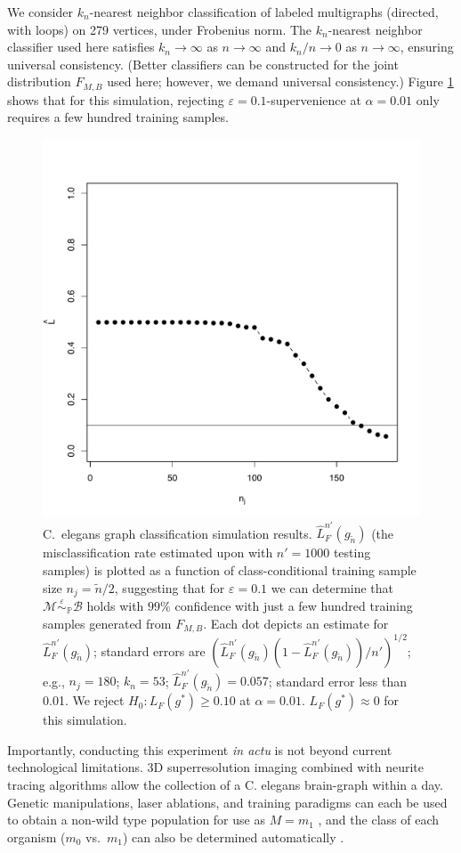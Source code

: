 \documentclass{article}
\newcommand{\mB}{\mathcal{B}}
\newcommand{\mM}{\mathcal{M}}
\newcommand{\PP}{\mathbb{P}}           %
\newcommand{\eps}{\varepsilon}
\providecommand{\mt}[1]{\widetilde{#1}}
\newcommand{\hL}{\widehat{L}}
\newcommand{\MeB}{\mM \overset{\varepsilon}{{\sim}}_{\PP} \mB}
\begin{document}
We consider $k_n$-nearest neighbor classification of labeled multigraphs (directed, with loops) on 279 vertices, under Frobenius norm. The $k_n$-nearest neighbor classifier used here satisfies $k_n \rightarrow \infty$ as $n \rightarrow \infty$ and $k_n/n \rightarrow 0$ as $n \rightarrow \infty$, ensuring universal consistency. (Better classifiers can be constructed for the joint distribution $F_{M,B}$ used here; however, we demand universal consistency.)  Figure \ref{fig1} shows that for this simulation, rejecting $\eps=0.1$-supervenience at $\alpha=0.01$ only requires a few hundred training samples.

\begin{figure}[!ht]
\centering 
\includegraphics[width=.5\linewidth]{Lhatplot}
\caption{C.~elegans graph classification simulation results.  $\hL^{n'}_{F}(g_{\mt{n}})$  (the misclassification rate estimated upon with $n'=1000$ testing samples) %
is plotted as a function of class-conditional training sample size $n_j=\mt{n}/2$, suggesting that for $\varepsilon=0.1$ we can determine that $\MeB$ holds with $99\%$ confidence with just a few hundred training samples generated from $F_{M,B}$. Each dot depicts an estimate for $\hL^{n'}_{F}(g_{\mt{n}})$; standard errors are $(\hL^{n'}_{F}(g_{\mt{n}}) (1-\hL^{n'}_{F}(g_{\mt{n}}))/n')^{1/2}$; e.g., $n_j = 180$; $k_n = 53$; $\hL^{n'}_{F}(g_{\mt{n}}) = 0.057$; standard error less than 0.01. We reject $H_0: L_{F}(g^*) \geq 0.10$ at $\alpha=0.01$. $L_{F}(g^*) \approx 0$ for this simulation.}
\label{fig1}
\end{figure}

Importantly, conducting this experiment {\it in actu} is not beyond current technological limitations. 3D superresolution imaging \cite{Vaziri2008} combined with neurite tracing algorithms \cite{Helmstaedter2008,Mishchenko09,LuLichtman09} allow the collection of a C. elegans brain-graph within a day. Genetic manipulations, laser ablations, and training paradigms can each be used to obtain a non-wild type population for use as $M=m_1$ \cite{deBonoMaricq05}, and the class of each organism ($m_0$ vs.~$m_1$) can also be determined automatically \cite{Buckingham2008}.




\end{document}
